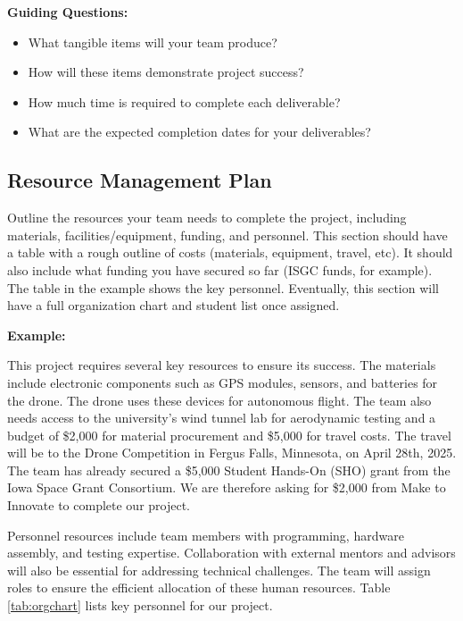\textbf{Guiding Questions:}
\begin{itemize}
    \item What tangible items will your team produce?
    \item How will these items demonstrate project success?
    \item How much time is required to complete each deliverable?
    \item What are the expected completion dates for your deliverables?
\end{itemize}

\subsection{Resource Management Plan}
Outline the resources your team needs to complete the project, including materials, facilities/equipment, funding, and personnel. This section should have a table with a rough outline of costs (materials, equipment, travel, etc). It should also include what funding you have secured so far (ISGC funds, for example). The table in the example shows the key personnel. Eventually, this section will have a full organization chart and student list once assigned. 

\textbf{Example:}

This project requires several key resources to ensure its success. The materials include electronic components such as GPS modules, sensors, and batteries for the drone. The drone uses these devices for autonomous flight. The team also needs access to the university's wind tunnel lab for aerodynamic testing and a budget of \$2,000 for material procurement and \$5,000 for travel costs. The travel will be to the Drone Competition in Fergus Falls, Minnesota, on April 28th, 2025. The team has already secured a \$5,000 Student Hands-On (SHO) grant from the Iowa Space Grant Consortium. We are therefore asking for \$2,000 from Make to Innovate to complete our project. 

Personnel resources include team members with programming, hardware assembly, and testing expertise. Collaboration with external mentors and advisors will also be essential for addressing technical challenges. The team will assign roles to ensure the efficient allocation of these human resources. Table \ref{tab:orgchart} lists key personnel for our project.

